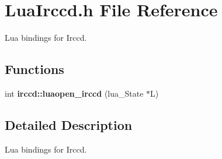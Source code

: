 \hypertarget{a00093}{\section{Lua\-Irccd.\-h File Reference}
\label{a00093}
}


Lua bindings for Irccd.  


\subsection*{Functions}
\begin{DoxyCompactItemize}
\item 
int {\bfseries irccd\-::luaopen\-\_\-irccd} (lua\-\_\-\-State $\ast$L)
\end{DoxyCompactItemize}


\subsection{Detailed Description}
Lua bindings for Irccd. 